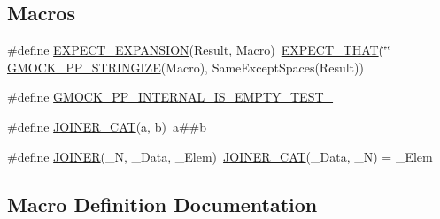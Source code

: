 \subsection*{Macros}
\begin{DoxyCompactItemize}
\item 
\#define \mbox{\hyperlink{_obj__test_2lib_2googletest-master_2googlemock_2test_2gmock-pp-string__test_8cc_a50cfa9ecb65df9c804a5467d08da4faf}{E\+X\+P\+E\+C\+T\+\_\+\+E\+X\+P\+A\+N\+S\+I\+ON}}(Result,  Macro)~\mbox{\hyperlink{_obj__test_2lib_2googletest-release-1_88_81_2googlemock_2include_2gmock_2gmock-matchers_8h_ac31e206123aa702e1152bb2735b31409}{E\+X\+P\+E\+C\+T\+\_\+\+T\+H\+AT}}(\char`\"{}\char`\"{} \mbox{\hyperlink{_obj__test_2lib_2googletest-master_2googlemock_2include_2gmock_2internal_2gmock-pp_8h_a5e7b60e34a7bb66bac56c440f6aa52cb}{G\+M\+O\+C\+K\+\_\+\+P\+P\+\_\+\+S\+T\+R\+I\+N\+G\+I\+ZE}}(Macro), Same\+Except\+Spaces(Result))
\item 
\#define \mbox{\hyperlink{_obj__test_2lib_2googletest-master_2googlemock_2test_2gmock-pp-string__test_8cc_ab8635d85cb91992914a106bb5c229829}{G\+M\+O\+C\+K\+\_\+\+P\+P\+\_\+\+I\+N\+T\+E\+R\+N\+A\+L\+\_\+\+I\+S\+\_\+\+E\+M\+P\+T\+Y\+\_\+\+T\+E\+S\+T\+\_}}
\item 
\#define \mbox{\hyperlink{_obj__test_2lib_2googletest-master_2googlemock_2test_2gmock-pp-string__test_8cc_a061e03ac22467881369813e8d73ddf61}{J\+O\+I\+N\+E\+R\+\_\+\+C\+AT}}(a,  b)~a\#\#b
\item 
\#define \mbox{\hyperlink{_obj__test_2lib_2googletest-master_2googlemock_2test_2gmock-pp-string__test_8cc_a417889002d582097e444f103350c05cb}{J\+O\+I\+N\+ER}}(\+\_\+N,  \+\_\+\+Data,  \+\_\+\+Elem)~\mbox{\hyperlink{_obj__test_2lib_2googletest-master_2googlemock_2test_2gmock-pp-string__test_8cc_a061e03ac22467881369813e8d73ddf61}{J\+O\+I\+N\+E\+R\+\_\+\+C\+AT}}(\+\_\+\+Data, \+\_\+N) = \+\_\+\+Elem
\end{DoxyCompactItemize}


\subsection{Macro Definition Documentation}
\mbox{\label{_obj__test_2lib_2googletest-master_2googlemock_2test_2gmock-pp-string__test_8cc_a50cfa9ecb65df9c804a5467d08da4faf}} 
